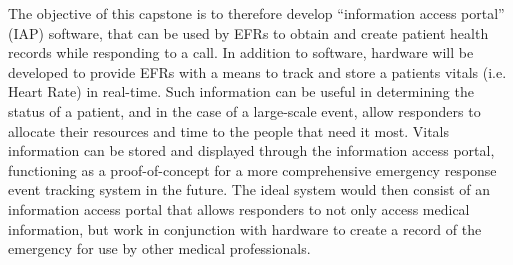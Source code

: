 \iffalse The objective of this capstone is to therefore develop an information management system that stores health records for access by patients, and their healthcare providers. \fi The objective of this capstone is to therefore develop ``information access portal'' (IAP) software, that can be used by EFRs to obtain and create patient health records while responding to a call. In addition to software, hardware will be developed to provide EFRs with a means to track and store a patients vitals (i.e. Heart Rate) in real-time. Such information can be useful in determining the status of a patient, and in the case of a large-scale event, allow responders to allocate their resources and time to the people that need it most. Vitals information can be stored and displayed through the information access portal, functioning as a proof-of-concept for a more comprehensive emergency response event tracking system in the future. The ideal system would then consist of an information access portal that allows responders to not only access medical information, but work in conjunction with hardware to create a record of the emergency for use by other medical professionals.
